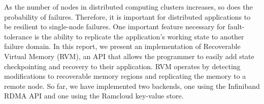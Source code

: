 As the number of nodes in distributed computing clusters increases, so does the probability of failures. Therefore, it is important for distributed applications to be resilient to single-node failures. 
One important feature necessary for fault-tolerance is the ability to replicate the application's working state to another failure domain. In this report, we present an implementation of Recoverable Virtual Memory (RVM), an API that allows the programmer to easily add state checkpointing and recovery to their application. RVM operates by detecting modifications to recoverable memory regions and replicating the memory to a remote node. So far, we have implemented two backends, one using the Infiniband RDMA API and one using the Ramcloud key-value store.

